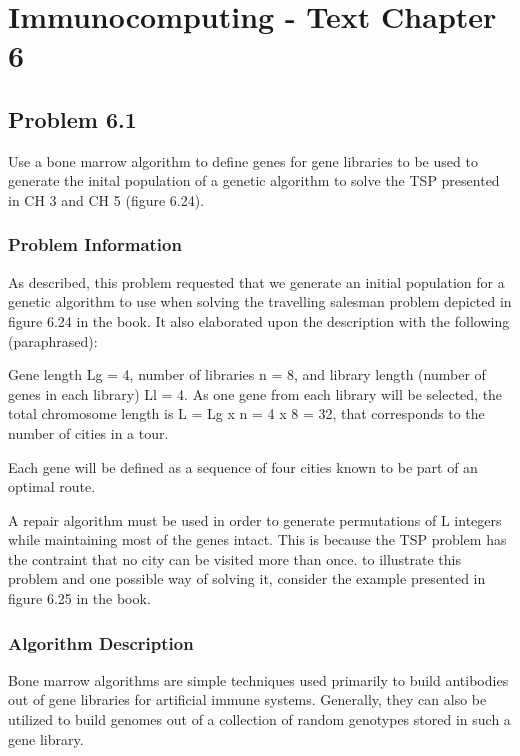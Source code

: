 
\chapter{Immunocomputing - Text Chapter 6}

\section{Problem 6.1}

Use a bone marrow algorithm to define genes for gene libraries to be used to generate the inital population of a genetic algorithm to solve the TSP presented in CH 3 and CH 5 (figure 6.24).

\subsection{Problem Information}

As described, this problem requested that we generate an initial population for a genetic algorithm to use when solving the travelling salesman problem depicted in figure 6.24 in the book.  It also elaborated upon the description with the following (paraphrased):


Gene length Lg = 4, number of libraries n = 8, and library length (number of genes in each library) Ll = 4.  As one gene from each library will be selected, the total chromosome length is L = Lg x n = 4 x 8 = 32, that corresponds to the number of cities in a tour.


Each gene will be defined as a sequence of four cities known to be part of an optimal route.


A repair algorithm must be used in order to generate permutations of L integers while maintaining most of the genes intact.  This is because the TSP problem has the contraint that no city can be visited more than once.  to illustrate this problem and one possible way of solving it, consider the example presented in figure 6.25 in the book.

\subsection{Algorithm Description}

Bone marrow algorithms are simple techniques used primarily to build antibodies out of gene libraries for artificial immune systems.  Generally, they can also be utilized to build genomes out of a collection of random genotypes stored in such a gene library.


